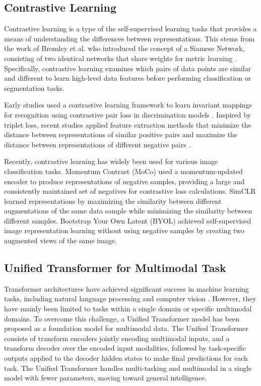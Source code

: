\subsection{Contrastive Learning}
Contrastive learning is a type of the self-supervised learning tasks that provides a means of understanding the differences between representations. This stems from the work of Bromley et al. who introduced the concept of a Siamese Network, consisting of two identical networks that share weights for metric learning \cite{bromley1993signature}. Specifically, contrastive learning examines which pairs of data points are similar and different to learn high-level data features before performing classification or segmentation tasks.

Early studies used a contrastive learning framework to learn invariant mappings for recognition using contrastive pair loss in discrimination models \cite{chopra2005learning,hadsell2006dimensionality}. Inspired by triplet loss, recent studies applied feature extraction methods that minimize the distance between representations of similar positive pairs and maximize the distance between representations of different negative pairs \cite{weinberger2009distance,collobert2008unified,chechik2010large}.

Recently, contrastive learning has widely been used for various image classification tasks.
Momentum Contrast (MoCo) \cite{he2020momentum,chen2020improved} used a momentum-updated encoder to produce representations of negative samples, providing a large and consistently maintained set of negatives for contrastive loss calculations.
SimCLR \cite{chen2020simple,chen2020big} learned representations by maximizing the similarity between different augmentations of the same data sample while minimizing the similarity between different samples.
Bootstrap Your Own Latent (BYOL) \cite{grill2020bootstrap} achieved self-supervised image representation learning without using negative samples by creating two augmented views of the same image.

\subsection{Unified Transformer for Multimodal Task}
Transformer architectures have achieved significant success in machine learning tasks, including natural language processing \cite{kenton2019bert,brown2020language} and computer vision \cite{dosovitskiy2020image}. However, they have mainly been limited to tasks within a single domain or specific multimodal domains. To overcome this challenge, a Unified Transformer model \cite{hu2021unit} has been proposed as a foundation model for multimodal data. 
The Unified Transformer consists of transform encoders jointly encoding multimodal inputs, and a transform decoder over the encoded input modalities, followed by task-specific outputs applied to the decoder hidden states to make final predictions for each task. The Unified Transformer handles multi-tasking and multimodal in a single model with fewer parameters, moving toward general intelligence. 

